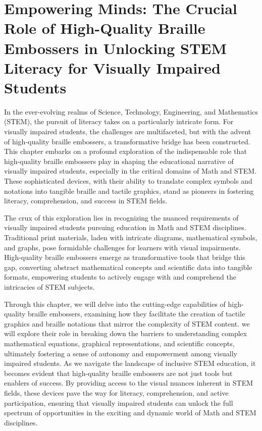 \documentclass[14pt,letterpaper,twoside]{extreport}
\begin{document}
\pagebreak \hypertarget{generation}{%
	\chapter{Empowering Minds: The Crucial Role of High-Quality Braille Embossers in Unlocking STEM Literacy for Visually Impaired Students}\label{generation}}
In the ever-evolving realms of Science, Technology, Engineering, and Mathematics (STEM), the pursuit of literacy takes on a particularly intricate form. For visually impaired students, the challenges are multifaceted, but with the advent of high-quality braille embossers, a transformative bridge has been constructed. This chapter embarks on a profound exploration of the indispensable role that high-quality braille embossers play in shaping the educational narrative of visually impaired students, especially in the critical domains of Math and STEM. These sophisticated devices, with their ability to translate complex symbols and notations into tangible braille and tactile graphics, stand as pioneers in fostering literacy, comprehension, and success in STEM fields.

The crux of this exploration lies in recognizing the nuanced requirements of visually impaired students pursuing education in Math and STEM disciplines. Traditional print materials, laden with intricate diagrams, mathematical symbols, and graphs, pose formidable challenges for learners with visual impairments. High-quality braille embossers emerge as transformative tools that bridge this gap, converting abstract mathematical concepts and scientific data into tangible formats, empowering students to actively engage with and comprehend the intricacies of STEM subjects.

Through this chapter, we will delve into the cutting-edge capabilities of high-quality braille embossers, examining how they facilitate the creation of tactile graphics and braille notations that mirror the complexity of STEM content. we will explore their role in breaking down the barriers to understanding complex mathematical equations, graphical representations, and scientific concepts, ultimately fostering a sense of autonomy and empowerment among visually impaired students. As we navigate the landscape of inclusive STEM education, it becomes evident that high-quality braille embossers are not just tools but enablers of success. By providing access to the visual nuances inherent in STEM fields, these devices pave the way for literacy, comprehension, and active participation, ensuring that visually impaired students can unlock the full spectrum of opportunities in the exciting and dynamic world of Math and STEM disciplines.
\end{document}
